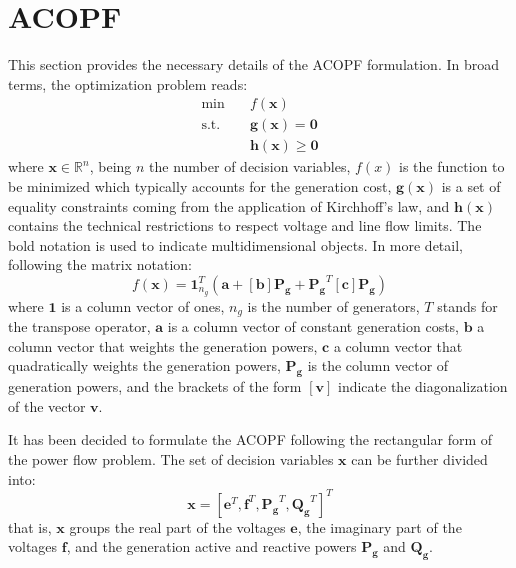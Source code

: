 \documentclass{article}
\begin{document}
\section{ACOPF}
This section provides the necessary details of the ACOPF formulation. In broad terms, the optimization problem reads: 
\begin{equation}
\begin{split}
    \text{min} \quad & f(\bm{x}) \\
    \text{s.t.} \quad & \bm{g}(\bm{x}) = \bm{0} \\
     & \bm{h}(\bm{x}) \geq \bm{0}
\end{split}
\end{equation}
where $\bm{x} \in \mathbb{R}^n$, being $n$ the number of decision variables, $f(x)$ is the function to be minimized which typically accounts for the generation cost, $\bm{g}(\bm{x})$ is a set of equality constraints coming from the application of Kirchhoff's law, and $\bm{h}(\bm{x})$ contains the technical restrictions to respect voltage and line flow limits. The bold notation is used to indicate multidimensional objects. In more detail, following the matrix notation:
\begin{equation}
    f(\bm{x}) = \bm{1}^T_{n_g} (\bm{a} + [\bm{b}]\bm{P_g} + \bm{P_g}^T [\bm{c}] \bm{P_g})
\end{equation}
where $\bm{1}$ is a column vector of ones, $n_g$ is the number of generators, $T$ stands for the transpose operator, $\bm{a}$ is a column vector of constant generation costs, $\bm{b}$ a column vector that weights the generation powers, $\bm{c}$ a column vector that quadratically weights the generation powers, $\bm{P_g}$ is the column vector of generation powers, and the brackets of the form $[\bm{v}]$ indicate the diagonalization of the vector $\bm{v}$. 

It has been decided to formulate the ACOPF following the rectangular form of the power flow problem. The set of decision variables $\bm{x}$ can be further divided into:
\begin{equation}
    \bm{x} = [\bm{e}^T, \bm{f}^T, \bm{P_g}^T, \bm{Q_g}^T]^T
\end{equation}
that is, $\bm{x}$ groups the real part of the voltages $\bm{e}$, the imaginary part of the voltages $\bm{f}$, and the generation active and reactive powers $\bm{P_g}$ and $\bm{Q_g}$. 
\end{document}
